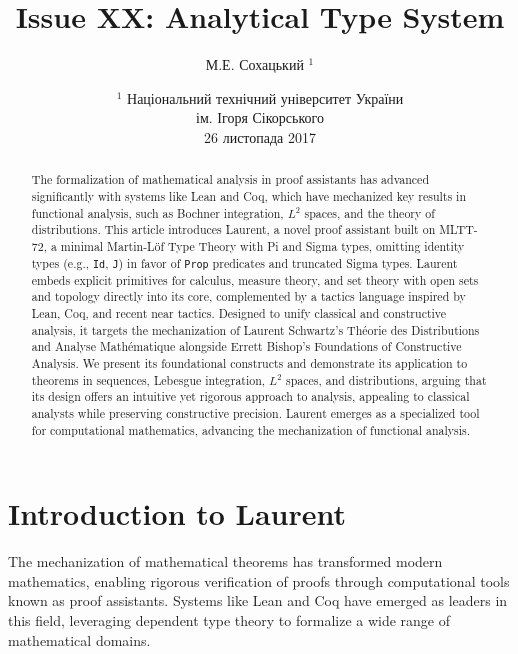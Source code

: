 \documentclass{article}
\begin{document}
\author { М.Е. Сохацький $^1$ }
\title { Issue XX: Analytical Type System }
\date{ \small $^1$ Національний технічний університет України \\
       ім. Ігоря Сікорського \\
       26 листопада 2017 }
\maketitle


\begin{abstract}

  The formalization of mathematical analysis in proof assistants has
  advanced significantly with systems like Lean and Coq, which have
  mechanized key results in functional analysis, such as Bochner
  integration, $L^2$ spaces, and the theory of distributions. This
  article introduces Laurent, a novel proof assistant built on MLTT-72,
  a minimal Martin-Löf Type Theory with Pi and Sigma types, omitting
  identity types (e.g., \texttt{Id}, \texttt{J}) in favor of
  \texttt{Prop} predicates and truncated Sigma types. Laurent
  embeds explicit primitives for calculus, measure theory, and set
  theory with open sets and topology directly into its core,
  complemented by a tactics language inspired by Lean, Coq, and
  recent near tactics. Designed to unify classical and constructive
  analysis, it targets the mechanization of Laurent Schwartz’s Théorie
  des Distributions and Analyse Mathématique alongside Errett Bishop’s
  Foundations of Constructive Analysis. We present its foundational
  constructs and demonstrate its application to theorems in sequences,
  Lebesgue integration, $L^2$ spaces, and distributions, arguing that
  its design offers an intuitive yet rigorous approach to analysis,
  appealing to classical analysts while preserving constructive
  precision. Laurent emerges as a specialized tool for computational
  mathematics, advancing the mechanization of functional analysis.

\end{abstract}

\ifincludeTOC
  \tableofcontents
\else
\fi

\newpage

\section{Introduction to Laurent}
The mechanization of mathematical theorems has transformed modern mathematics,
enabling rigorous verification of proofs through computational tools known as
proof assistants. Systems like Lean and Coq have emerged as leaders in this field,
leveraging dependent type theory to formalize a wide range of mathematical domains.
\end{document}
